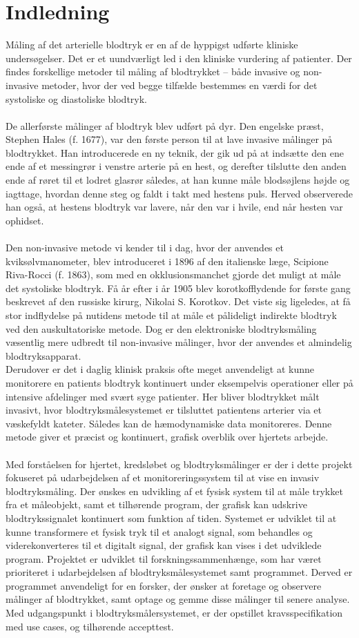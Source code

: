\chapter{Indledning}
Måling af det arterielle blodtryk er en af de hyppigst udførte kliniske undersøgelser. Det er et uundværligt led i den kliniske vurdering af patienter. Der findes forskellige metoder til måling af blodtrykket – både invasive og non-invasive metoder, hvor der ved begge tilfælde bestemmes en værdi for det systoliske og diastoliske blodtryk. \\\\
De allerførste målinger af blodtryk blev udført på dyr. Den engelske præst, Stephen Hales (f. 1677), var den første person til at lave invasive målinger på blodtrykket. Han introducerede en ny teknik, der gik ud på at indsætte den ene ende af et messingrør i venstre arterie på en hest, og derefter tilslutte den anden ende af røret til et lodret glasrør således, at han kunne måle blodsøjlens højde og iagttage, hvordan denne steg og faldt i takt med hestens puls. Herved observerede han også, at hestens blodtryk var lavere, når den var i hvile, end når hesten var ophidset. \\\\
Den non-invasive metode vi kender til i dag, hvor der anvendes et kviksølvmanometer, blev introduceret i 1896 af den italienske læge, Scipione Riva-Rocci (f. 1863), som med en okklusionsmanchet gjorde det muligt at måle det systoliske blodtryk. Få år efter i år 1905 blev korotkofflydende for første gang beskrevet af den russiske kirurg, Nikolai S. Korotkov. Det viste sig ligeledes, at få stor indflydelse på nutidens metode til at måle et pålideligt indirekte blodtryk ved den auskultatoriske metode. Dog er den elektroniske blodtryksmåling væsentlig mere udbredt til non-invasive målinger, hvor der anvendes et almindelig blodtryksapparat. \\
Derudover er det i daglig klinisk praksis ofte meget anvendeligt at kunne monitorere en patients blodtryk kontinuert under eksempelvis operationer eller på intensive afdelinger med svært syge patienter. Her bliver blodtrykket målt invasivt, hvor blodtryksmålesystemet er tilsluttet patientens arterier via et væskefyldt kateter. Således kan de hæmodynamiske data monitoreres. Denne metode giver et præcist og kontinuert, grafisk overblik over hjertets arbejde. \\\\
Med forståelsen for hjertet, kredsløbet og blodtryksmålinger er der i dette projekt fokuseret på udarbejdelsen af et monitoreringssystem til at vise en invasiv blodtryksmåling. Der ønskes en udvikling af et fysisk system til at måle trykket fra et måleobjekt, samt et tilhørende program, der grafisk kan udskrive blodtrykssignalet kontinuert som funktion af tiden. Systemet er udviklet til at kunne transformere et fysisk tryk til et analogt signal, som behandles og viderekonverteres til et digitalt signal, der grafisk kan vises i det udviklede program. Projektet er udviklet til forskningssammenhænge, som har været prioriteret i udarbejdelsen af blodtryksmålesystemet samt programmet. Derved er programmet anvendeligt for en forsker, der ønsker at foretage og observere målinger af blodtrykket, samt optage og gemme disse målinger til senere analyse. 
Med udgangspunkt i blodtryksmålersystemet, er der opstillet kravsspecifikation med use cases, og tilhørende accepttest. 

